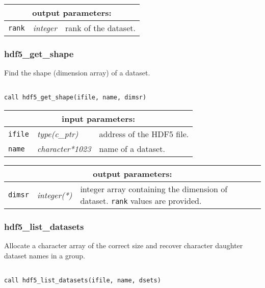 \noindent
\begin{tabular}{|p{1.5cm}|p{3cm}|p{10cm}|}
\hline
\multicolumn{3}{|c|}{\bf output parameters:} \\
\hline
{\tt rank} & {\it integer} & rank of the dataset. \\
\hline
\end{tabular}

\subsubsection{hdf5\_get\_shape}

Find the shape (dimension array) of a dataset.

\begin{verbatim}

call hdf5_get_shape(ifile, name, dimsr)
\end{verbatim}

\noindent
\begin{tabular}{|p{1.5cm}|p{3cm}|p{10cm}|}
\hline
\multicolumn{3}{|c|}{\bf input parameters:} \\
\hline
{\tt ifile} & {\it type(c\_ptr)} & address of the HDF5 file. \\
\hline
{\tt name} & {\it character*1023} & name of a dataset. \\
\hline
\end{tabular}

\vskip 0.8cm

\noindent
\begin{tabular}{|p{1.5cm}|p{3cm}|p{10cm}|}
\hline
\multicolumn{3}{|c|}{\bf output parameters:} \\
\hline
{\tt dimsr} & {\it integer(*)} & integer array containing the dimension of dataset. {\tt rank} values are provided. \\
\hline
\end{tabular}

\subsubsection{hdf5\_list\_datasets}

Allocate a character array of the correct size and recover character daughter dataset names in a group.

\begin{verbatim}

call hdf5_list_datasets(ifile, name, dsets)
\end{verbatim}

